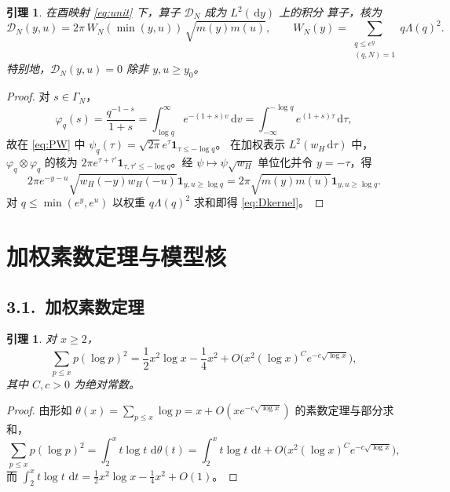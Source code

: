 \documentclass[12pt,a4paper]{amsart}
\numberwithin{equation}{section}
\theoremstyle{plain}
\newtheorem{lemma}[theorem]{引理}
\theoremstyle{definition}
\newcommand{\dd}{\,\mathrm{d}}
\begin{document}
\begin{lemma}\label{lem:FL}
在酉映射 \eqref{eq:unit} 下，算子 $\mathcal D_N$ 成为 $L^2(\dd y)$ 上的积分
算子，核为
\begin{equation}\label{eq:Dkernel}
 \mathscr D_N(y,u)=2\pi\,W_N(\min(y,u))\,\sqrt{m(y)m(u)},
 \qquad
 W_N(y)=\sum_{\substack{q\le e^y\\(q,N)=1}}q\Lambda(q)^2 .
\end{equation}
特别地，$\mathscr D_N(y,u)=0$ 除非 $y,u\ge y_0$。
\end{lemma}

\begin{proof}
对 $s\in\Gamma_N$，
\[
 \varphi_q(s)=\frac{q^{-1-s}}{1+s}=\int_{\log q}^{\infty}e^{-(1+s)v}\dd v
 =\int_{-\infty}^{-\log q}e^{(1+s)\tau}\dd\tau,
\]
故在 \eqref{eq:PW} 中 $\psi_q(\tau)=\sqrt{2\pi}e^{\tau}\mathbf 1_{\tau\le-\log q}$。
在加权表示 $L^2(w_H\dd\tau)$ 中，$\varphi_q\otimes\varphi_q$ 的核为
$2\pi e^{\tau+\tau'}\mathbf 1_{\tau,\tau'\le-\log q}$。经 $\psi\mapsto\psi\sqrt{w_H}$
单位化并令 $y=-\tau$，得
\[
 2\pi e^{-y-u}\sqrt{w_H(-y)w_H(-u)}\mathbf 1_{y,u\ge\log q}
 =2\pi\sqrt{m(y)m(u)}\mathbf 1_{y,u\ge\log q} .
\]
对 $q\le\min(e^y,e^u)$ 以权重 $q\Lambda(q)^2$ 求和即得 \eqref{eq:Dkernel}。
\end{proof}

\section{加权素数定理与模型核}\label{sec:pnt}

\subsection*{3.1.\ 加权素数定理}

\begin{lemma}\label{lem:pnt}
对 $x\ge2$，
\begin{equation}\label{eq:pnt}
 \sum_{p\le x}p(\log p)^2
 =\frac12x^2\log x-\frac14x^2+O\bigl(x^2(\log x)^Ce^{-c\sqrt{\log x}}\bigr),
\end{equation}
其中 $C,c>0$ 为绝对常数。
\end{lemma}

\begin{proof}
由形如
$\theta(x)=\sum_{p\le x}\log p=x+O(xe^{-c\sqrt{\log x}})$ 的素数定理与部分求和，
\[
 \sum_{p\le x}p(\log p)^2=\int_2^x t\log t\,\dd\theta(t)
 =\int_2^x t\log t\,\dd t+O\bigl(x^2(\log x)^Ce^{-c\sqrt{\log x}}\bigr),
\]
而 $\int_2^x t\log t\,\dd t=\frac12x^2\log x-\frac14x^2+O(1)$。
\end{proof}
\end{document}
